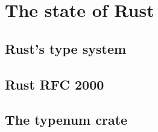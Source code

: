 \section{The state of Rust} 

\subsection{Rust's type system} 

\subsection{Rust RFC 2000} 

\subsection{The typenum crate}
